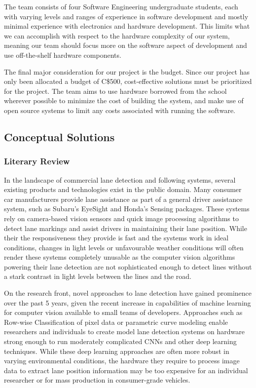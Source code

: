 \documentclass[titlepage,draft]{article}
\begin{document}
The team consists of four Software Engineering undergraduate students, each with varying levels and ranges of experience in software development and mostly minimal experience with electronics and hardware development. This limits what we can accomplish with respect to the hardware complexity of our system, meaning our team should focus more on the software aspect of development and use off-the-shelf hardware components.

The final major consideration for our project is the budget. Since our project has only been allocated a budget of C\$500, cost-effective solutions must be prioritized for the project. The team aims to use hardware borrowed from the school wherever possible to minimize the cost of building the system, and make use of open source systems to limit any costs associated with running the software.

\subsection{Conceptual Solutions}

\subsubsection{Literary Review}

In the landscape of commercial lane detection and following systems, several existing products and technologies exist in the public domain. Many consumer car manufacturers provide lane assistance as part of a general driver assistance system, such as Subaru’s EyeSight\cite{subaru_eyesight} and Honda’s Sensing \cite{honda_sensing} packages. These systems rely on camera-based vision sensors and quick image processing algorithms to detect lane markings and assist drivers in maintaining their lane position. While their the responsiveness they provide is fast and the systems work in ideal conditions, changes in light levels or unfavourable weather conditions will often render these systems completely unusable as the computer vision algorithms powering their lane detection are not sophisticated enough to detect lines without a stark contrast in light levels between the lines and the road.


On the research front, novel approaches to lane detection have gained prominence over the past 5 years, given the recent increase in capabilities of machine learning for computer vision available to small teams of developers. Approaches such as Row-wise Classification\cite{rowwiseclass} of pixel data or parametric curve modeling \cite{feng2023rethinking} enable researchers and individuals to create model lane detection systems on hardware strong enough to run moderately complicated CNNs and other deep learning techniques. While these deep learning approaches are often more robust in varying environmental conditions, the hardware they require to process image data to extract lane position information may be too expensive for an individual researcher or for mass production in consumer-grade vehicles.
\end{document}
